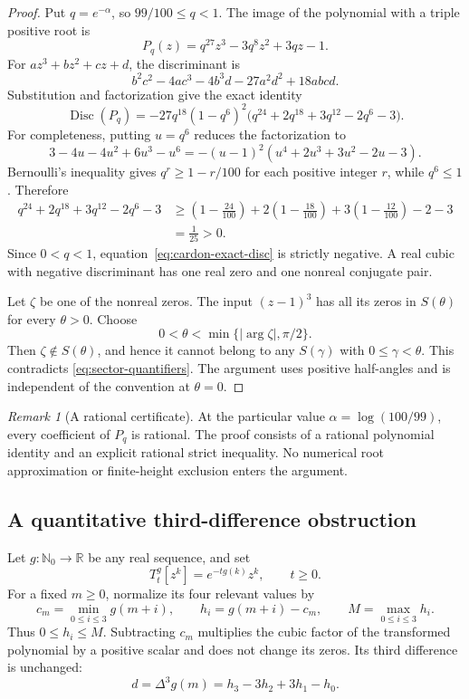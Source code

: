\documentclass[11pt,a4paper]{article}
\theoremstyle{definition}
\theoremstyle{remark}
\newtheorem{remark}[theorem]{Remark}
\begin{document}
\begin{proof}
Put $q=e^{-\alpha}$, so $99/100\leq q<1$.  The image of the
polynomial with a triple positive root is
\[
 P_q(z)=q^{27}z^3-3q^8z^2+3qz-1.
\]
For $az^3+bz^2+cz+d$, the discriminant is
\[
 b^2c^2-4ac^3-4b^3d-27a^2d^2+18abcd.
\]
Substitution and factorization give the exact identity
\begin{equation}\label{eq:cardon-exact-disc}
 \operatorname{Disc}(P_q)
 =-27q^{18}(1-q^6)^2
   \bigl(q^{24}+2q^{18}+3q^{12}-2q^6-3\bigr).
\end{equation}
For completeness, putting $u=q^6$ reduces the factorization to
\[
 3-4u-4u^2+6u^3-u^6
 =-(u-1)^2(u^4+2u^3+3u^2-2u-3).
\]
Bernoulli's inequality gives $q^r\geq1-r/100$ for each
positive integer $r$, while $q^6\leq1$.  Therefore
\begin{align*}
 q^{24}+2q^{18}+3q^{12}-2q^6-3
 &\geq
 \left(1-\frac{24}{100}\right)
 +2\left(1-\frac{18}{100}\right)
 +3\left(1-\frac{12}{100}\right)-2-3\\
 &=\frac1{25}>0.
\end{align*}
Since $0<q<1$, equation~\eqref{eq:cardon-exact-disc} is strictly
negative.  A real cubic with negative discriminant has one real
zero and one nonreal conjugate pair.

Let $\zeta$ be one of the nonreal zeros.  The input $(z-1)^3$
has all its zeros in $S(\theta)$ for every $\theta>0$.
Choose
\[
 0<\theta<\min\{|\arg\zeta|,\pi/2\}.
\]
Then $\zeta\notin S(\theta)$, and hence it cannot belong to any
$S(\gamma)$ with $0\leq\gamma<\theta$.  This contradicts
\eqref{eq:sector-quantifiers}.  The argument uses positive
half-angles and is independent of the convention at $\theta=0$.
\end{proof}

\begin{remark}[A rational certificate]
At the particular value $\alpha=\log(100/99)$, every coefficient
of $P_q$ is rational.  The proof consists of a rational polynomial
identity and an explicit rational strict inequality.  No numerical
root approximation or finite-height exclusion enters the argument.
\end{remark}

\subsection{A quantitative third-difference obstruction}

Let $g:\mathbb N_0\to\mathbb R$ be any real sequence, and set
\begin{equation}\label{eq:diagonal-flow}
 T_t^g[z^k]=e^{-t g(k)}z^k,\qquad t\ge0.
\end{equation}
For a fixed $m\ge0$, normalize its four relevant values by
\[
 c_m=\min_{0\le i\le3}g(m+i),\qquad
 h_i=g(m+i)-c_m,\qquad
 M=\max_{0\le i\le3}h_i.
\]
Thus $0\le h_i\le M$.  Subtracting $c_m$ multiplies the cubic
factor of the transformed polynomial by a positive scalar and does
not change its zeros.  Its third difference is unchanged:
\[
 d=\Delta^3g(m)=h_3-3h_2+3h_1-h_0.
\]
\end{document}
